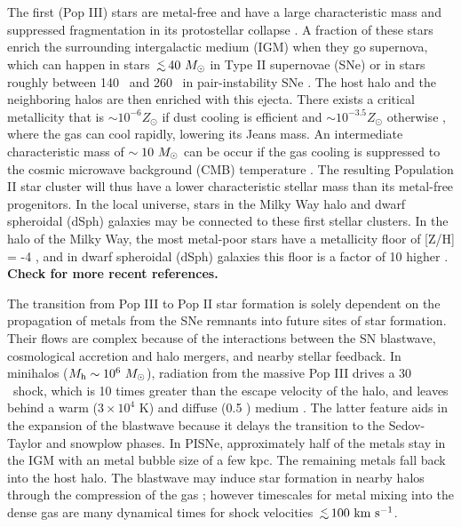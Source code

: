 \documentclass[apjl]{emulateapj}
\begin{document}
The first (Pop III) stars are metal-free and have a large
characteristic mass and suppressed fragmentation in its protostellar
collapse \citep{Abel00, ABN02, Bromm02_P3, Yoshida03, OShea07a}.  A
fraction of these stars enrich the surrounding intergalactic medium
(IGM) when they go supernova, which can happen in stars $\lsim40~\Ms$
in Type II supernovae (SNe) or in stars roughly between 140 \Ms~and
260 \Ms~in pair-instability SNe \citep[PISNe;][]{2002ApJ...567..532H}.
The host halo and the neighboring halos are then enriched with this
ejecta.  There exists a critical metallicity that is $\sim 10^{-6}
Z_\odot$ if dust cooling is efficient \citep{Omukai05,
  Schneider06_Frag, clark08} and $\sim 10^{-3.5} Z_\odot$ otherwise
\citep{Bromm01, 2009ApJ...691..441S}, where the gas can cool rapidly,
lowering its Jeans mass.  An intermediate characteristic mass of
$\sim10~\Ms$ can be occur if the gas cooling is suppressed to the
cosmic microwave background (CMB) temperature \citep{Larson98,
  Tumlinson07_IMF, 2009ApJ...691..441S}.  The resulting Population II
star cluster will thus have a lower characteristic stellar mass than
its metal-free progenitors.  In the local universe, stars in the Milky
Way halo and dwarf spheroidal (dSph) galaxies may be connected to
these first stellar clusters.  In the halo of the Milky Way, the most
metal-poor stars have a metallicity floor of [Z/H] = -4
\citep{Beers05}, and in dwarf spheroidal (dSph) galaxies this floor is
a factor of 10 higher \citep{Tolstoy04, Helmi06}.  \textbf{Check for
  more recent references.}

The transition from Pop III to Pop II star formation is solely
dependent on the propagation of metals from the SNe remnants into
future sites of star formation.  Their flows are complex because of
the interactions between the SN blastwave, cosmological accretion and
halo mergers, and nearby stellar feedback.  In minihalos ($M_{\rm h}
\sim 10^6~\Ms$), radiation from the massive Pop III drives a 30
\kms~shock, which is 10 times greater than the escape velocity of the
halo, and leaves behind a warm ($3 \times 10^4$ K) and diffuse (0.5
\cubecm) medium \citep{Kitayama04, Whalen04, Abel07}.  The latter
feature aids in the expansion of the blastwave because it delays the
transition to the Sedov-Taylor and snowplow phases.  In PISNe,
approximately half of the metals stay in the IGM with an metal bubble
size of a few kpc.  The remaining metals fall back into the host halo.
The blastwave may induce star formation in nearby halos through the
compression of the gas \citep{Ferrara98}; however timescales for metal
mixing into the dense gas are many dynamical times \citep{Cen08} for
shock velocities $\lsim 100~\kms$.
\end{document}

